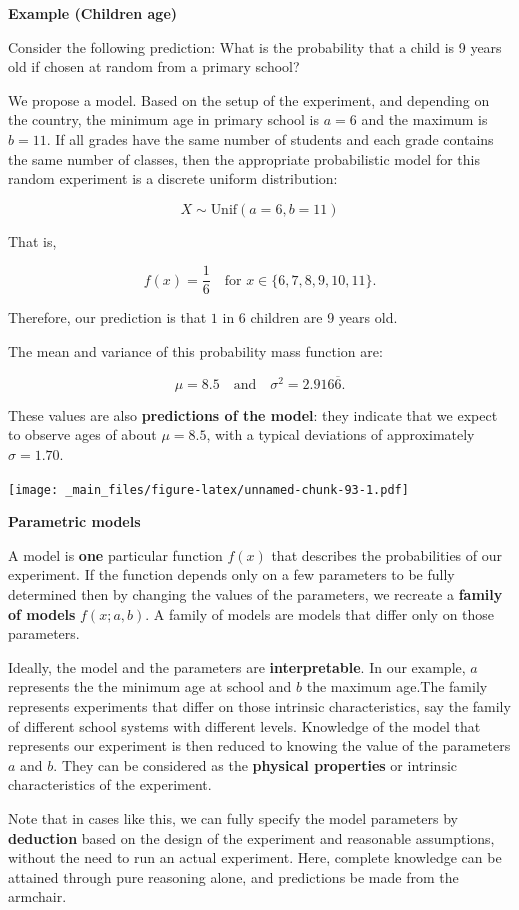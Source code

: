 \documentclass[
]{book}
\begin{document}
\textbf{Example (Children age)}

Consider the following prediction: What is the probability that a child is 9 years old if chosen at random from a primary school?

We propose a model. Based on the setup of the experiment, and depending on the country, the minimum age in primary school is \(a = 6\) and the maximum is \(b = 11\). If all grades have the same number of students and each grade contains the same number of classes, then the appropriate probabilistic model for this random experiment is a discrete uniform distribution:

\[
X \sim \text{Unif}(a = 6, b = 11)
\]

That is,

\[
f(x) = \frac{1}{6} \quad \text{for } x \in \{6, 7, 8, 9, 10, 11\}.
\]

Therefore, our prediction is that \(1\) in \(6\) children are 9 years old.

The mean and variance of this probability mass function are:

\[
\mu = 8.5 \quad \text{and} \quad \sigma^2 = 2.916\overline{6}.
\]

These values are also \textbf{predictions of the model}: they indicate that we expect to observe ages of about \(\mu = 8.5\), with a typical deviations of approximately \(\sigma = 1.70\).

\texttt{[image: \_main\_files/figure-latex/unnamed-chunk-93-1.pdf]}

\textbf{Parametric models}

A model is \textbf{one} particular function \(f(x)\) that describes the probabilities of our experiment. If the function depends only on a few parameters to be fully determined then by changing the values of the parameters, we recreate a \textbf{family of models} \(f(x; a,b)\). A family of models are models that differ only on those parameters.

Ideally, the model and the parameters are \textbf{interpretable}. In our example, \(a\) represents the the minimum age at school and \(b\) the maximum age.The family represents experiments that differ on those intrinsic characteristics, say the family of different school systems with different levels. Knowledge of the model that represents our experiment is then reduced to knowing the value of the parameters \(a\) and \(b\). They can be considered as the \textbf{physical properties} or intrinsic characteristics of the experiment.

Note that in cases like this, we can fully specify the model parameters by \textbf{deduction} based on the design of the experiment and reasonable assumptions, without the need to run an actual experiment. Here, complete knowledge can be attained through pure reasoning alone, and predictions be made from the armchair.
\end{document}
